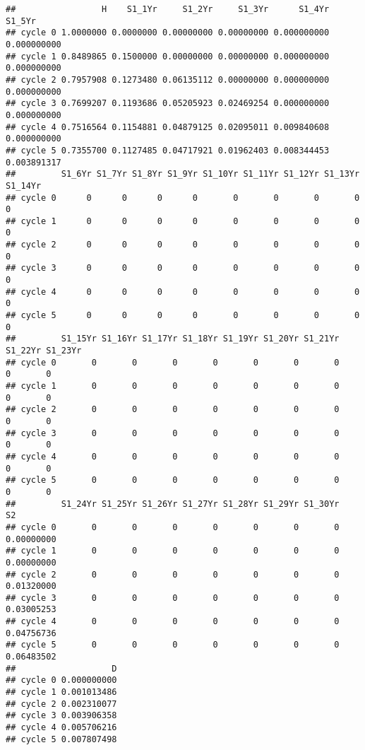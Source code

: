 \documentclass[
]{article}
\begin{document}
\begin{verbatim}
##                 H    S1_1Yr     S1_2Yr     S1_3Yr      S1_4Yr      S1_5Yr
## cycle 0 1.0000000 0.0000000 0.00000000 0.00000000 0.000000000 0.000000000
## cycle 1 0.8489865 0.1500000 0.00000000 0.00000000 0.000000000 0.000000000
## cycle 2 0.7957908 0.1273480 0.06135112 0.00000000 0.000000000 0.000000000
## cycle 3 0.7699207 0.1193686 0.05205923 0.02469254 0.000000000 0.000000000
## cycle 4 0.7516564 0.1154881 0.04879125 0.02095011 0.009840608 0.000000000
## cycle 5 0.7355700 0.1127485 0.04717921 0.01962403 0.008344453 0.003891317
##         S1_6Yr S1_7Yr S1_8Yr S1_9Yr S1_10Yr S1_11Yr S1_12Yr S1_13Yr S1_14Yr
## cycle 0      0      0      0      0       0       0       0       0       0
## cycle 1      0      0      0      0       0       0       0       0       0
## cycle 2      0      0      0      0       0       0       0       0       0
## cycle 3      0      0      0      0       0       0       0       0       0
## cycle 4      0      0      0      0       0       0       0       0       0
## cycle 5      0      0      0      0       0       0       0       0       0
##         S1_15Yr S1_16Yr S1_17Yr S1_18Yr S1_19Yr S1_20Yr S1_21Yr S1_22Yr S1_23Yr
## cycle 0       0       0       0       0       0       0       0       0       0
## cycle 1       0       0       0       0       0       0       0       0       0
## cycle 2       0       0       0       0       0       0       0       0       0
## cycle 3       0       0       0       0       0       0       0       0       0
## cycle 4       0       0       0       0       0       0       0       0       0
## cycle 5       0       0       0       0       0       0       0       0       0
##         S1_24Yr S1_25Yr S1_26Yr S1_27Yr S1_28Yr S1_29Yr S1_30Yr         S2
## cycle 0       0       0       0       0       0       0       0 0.00000000
## cycle 1       0       0       0       0       0       0       0 0.00000000
## cycle 2       0       0       0       0       0       0       0 0.01320000
## cycle 3       0       0       0       0       0       0       0 0.03005253
## cycle 4       0       0       0       0       0       0       0 0.04756736
## cycle 5       0       0       0       0       0       0       0 0.06483502
##                   D
## cycle 0 0.000000000
## cycle 1 0.001013486
## cycle 2 0.002310077
## cycle 3 0.003906358
## cycle 4 0.005706216
## cycle 5 0.007807498
\end{verbatim}
\end{document}
